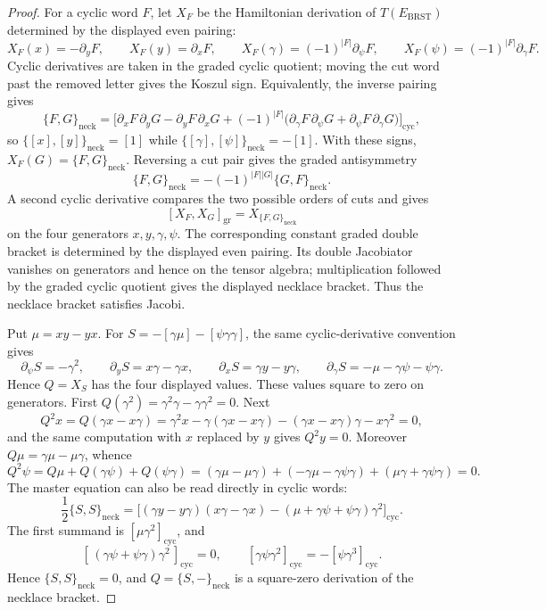 \documentclass[11pt]{memoir}
\begin{document}
\begin{proof}
  For a cyclic word \(F\), let \(X_F\) be the Hamiltonian derivation of
  \(T(E_{\mathrm{BRST}})\) determined by the displayed even pairing:
  \[
    X_F(x)=-\partial_yF,\qquad
    X_F(y)=\partial_xF,\qquad
    X_F(\gamma)=(-1)^{|F|}\partial_\psi F,\qquad
    X_F(\psi)=(-1)^{|F|}\partial_\gamma F .
  \]
  Cyclic derivatives are taken in the graded cyclic quotient; moving the
  cut word past the removed letter gives the Koszul sign.  Equivalently,
  the inverse pairing gives
  \[
    \{F,G\}_{\mathrm{neck}}
      =\bigl[
       \partial_xF\,\partial_yG-\partial_yF\,\partial_xG
       +(-1)^{|F|}\bigl(
         \partial_\gamma F\,\partial_\psi G
         +\partial_\psi F\,\partial_\gamma G\bigr)
      \bigr]_{\mathrm{cyc}},
  \]
  so \(\{[x],[y]\}_{\mathrm{neck}}=[1]\) while
  \(\{[\gamma],[\psi]\}_{\mathrm{neck}}=-[1]\).  With these
  signs, \(X_F(G)=\{F,G\}_{\mathrm{neck}}\).  Reversing a cut pair gives
  the graded antisymmetry
  \[
    \{F,G\}_{\mathrm{neck}}
      =-(-1)^{|F||G|}\{G,F\}_{\mathrm{neck}} .
  \]
  A second cyclic derivative compares the two possible orders of cuts and
  gives
  \[
    [X_F,X_G]_{\mathrm{gr}}=X_{\{F,G\}_{\mathrm{neck}}}
  \]
  on the four generators \(x,y,\gamma,\psi\).  The corresponding constant
  graded double bracket is determined by the displayed even pairing.  Its
  double Jacobiator vanishes on generators and hence on the tensor algebra;
  multiplication followed by the graded cyclic quotient gives the displayed
  necklace bracket.  Thus the necklace bracket satisfies Jacobi.

  Put \(\mu=xy-yx\).  For
  \(S=-[\gamma\mu]-[\psi\gamma\gamma]\), the same
  cyclic-derivative convention gives
  \[
    \partial_\psi S=-\gamma^2,\qquad
    \partial_yS=x\gamma-\gamma x,\qquad
    \partial_xS=\gamma y-y\gamma,\qquad
    \partial_\gamma S=-\mu-\gamma\psi-\psi\gamma .
  \]
  Hence \(Q=X_S\) has the four displayed values.  These values square to
  zero on generators.  First
  \(Q(\gamma^2)=\gamma^2\gamma-\gamma\gamma^2=0\).  Next
  \[
    Q^2x
      =Q(\gamma x-x\gamma)
      =\gamma^2x-\gamma(\gamma x-x\gamma)
       -(\gamma x-x\gamma)\gamma-x\gamma^2=0,
  \]
  and the same computation with \(x\) replaced by \(y\) gives
  \(Q^2y=0\).  Moreover \(Q\mu=\gamma\mu-\mu\gamma\), whence
  \[
    Q^2\psi
      =Q\mu+Q(\gamma\psi)+Q(\psi\gamma)
      =(\gamma\mu-\mu\gamma)+(-\gamma\mu-\gamma\psi\gamma)
        +(\mu\gamma+\gamma\psi\gamma)=0 .
  \]
  The master equation can also be read directly in cyclic words:
  \[
    \frac12\{S,S\}_{\mathrm{neck}}
      =\bigl[(\gamma y-y\gamma)(x\gamma-\gamma x)
       -(\mu+\gamma\psi+\psi\gamma)\gamma^2\bigr]_{\mathrm{cyc}}.
  \]
  The first summand is \([\mu\gamma^2]_{\mathrm{cyc}}\), and
  \[
    [\,(\gamma\psi+\psi\gamma)\gamma^2\,]_{\mathrm{cyc}}=0,
    \qquad
    [\gamma\psi\gamma^2]_{\mathrm{cyc}}
      =-[\psi\gamma^3]_{\mathrm{cyc}}.
  \]
  Hence \(\{S,S\}_{\mathrm{neck}}=0\), and
  \(Q=\{S,-\}_{\mathrm{neck}}\) is a square-zero derivation of the
  necklace bracket.


\end{proof}
\end{document}
